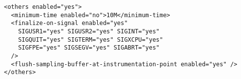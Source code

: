 \begin{verbatim}
<others enabled="yes">
  <minimum-time enabled="no">10M</minimum-time>
  <finalize-on-signal enabled="yes" 
    SIGUSR1="yes" SIGUSR2="yes" SIGINT="yes"
    SIGQUIT="yes" SIGTERM="yes" SIGXCPU="yes"
    SIGFPE="yes" SIGSEGV="yes" SIGABRT="yes"
  />
  <flush-sampling-buffer-at-instrumentation-point enabled="yes" />
</others>
\end{verbatim}
